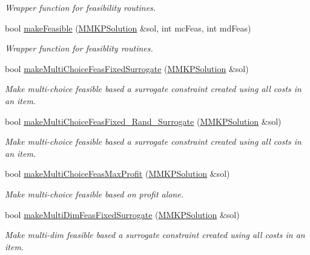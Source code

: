 \begin{DoxyCompactItemize}
\begin{DoxyCompactList}\small\item\em Wrapper function for feasibility routines. \end{DoxyCompactList}\item 
bool \hyperlink{class_m_m_k_p___t_l_b_o_a663310e7f122715a3c90a0f9839eb69f}{make\+Feasible} (\hyperlink{class_m_m_k_p_solution}{M\+M\+K\+P\+Solution} \&sol, int mc\+Feas, int md\+Feas)
\begin{DoxyCompactList}\small\item\em Wrapper function for feasiblity routines. \end{DoxyCompactList}\item 
bool \hyperlink{class_m_m_k_p___t_l_b_o_ac49eccf57219c4973cdae02b6e7a6e08}{make\+Multi\+Choice\+Feas\+Fixed\+Surrogate} (\hyperlink{class_m_m_k_p_solution}{M\+M\+K\+P\+Solution} \&sol)
\begin{DoxyCompactList}\small\item\em Make multi-\/choice feasible based a surrogate constraint created using all costs in an item. \end{DoxyCompactList}\item 
bool \hyperlink{class_m_m_k_p___t_l_b_o_a49ab01792695f1282e28eacf157c0dca}{make\+Multi\+Choice\+Feas\+Fixed\+\_\+\+Rand\+\_\+\+Surrogate} (\hyperlink{class_m_m_k_p_solution}{M\+M\+K\+P\+Solution} \&sol)
\begin{DoxyCompactList}\small\item\em Make multi-\/choice feasible based a surrogate constraint created using all costs in an item. \end{DoxyCompactList}\item 
bool \hyperlink{class_m_m_k_p___t_l_b_o_a6e466ab9f14bab8e1107c15867628e11}{make\+Multi\+Choice\+Feas\+Max\+Profit} (\hyperlink{class_m_m_k_p_solution}{M\+M\+K\+P\+Solution} \&sol)
\begin{DoxyCompactList}\small\item\em Make multi-\/choice feasible based on profit alone. \end{DoxyCompactList}\item 
bool \hyperlink{class_m_m_k_p___t_l_b_o_aa3c59da0a24ef64da308b5801e989e44}{make\+Multi\+Dim\+Feas\+Fixed\+Surrogate} (\hyperlink{class_m_m_k_p_solution}{M\+M\+K\+P\+Solution} \&sol)
\begin{DoxyCompactList}\small\item\em Make multi-\/dim feasible based a surrogate constraint created using all costs in an item. \end{DoxyCompactList}\item 

\end{DoxyCompactItemize}

